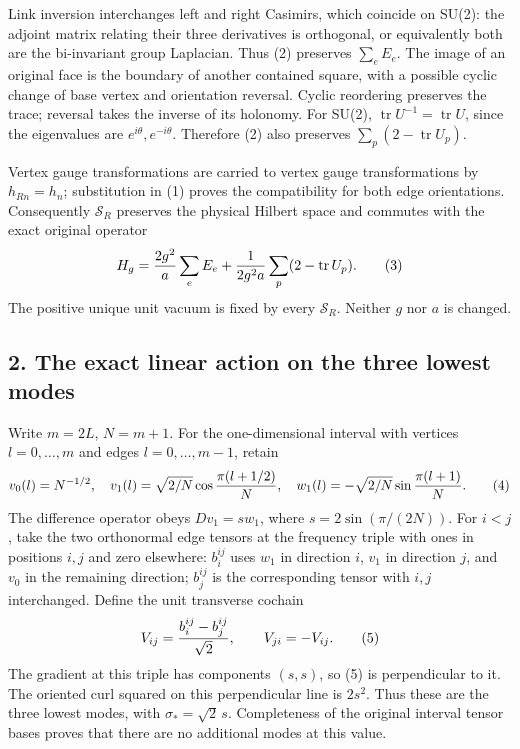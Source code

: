\documentclass[
  11pt,
]{article}
\begin{document}
Link inversion interchanges left and right Casimirs, which coincide on
SU(2): the adjoint matrix relating their three derivatives is
orthogonal, or equivalently both are the bi-invariant group Laplacian.
Thus (2) preserves \(\sum_e E_e\). The image of an original face is the
boundary of another contained square, with a possible cyclic change of
base vertex and orientation reversal. Cyclic reordering preserves the
trace; reversal takes the inverse of its holonomy. For SU(2),
\(\operatorname{tr}U^{-1}=\operatorname{tr}U\), since the eigenvalues
are \(e^{i\theta},e^{-i\theta}\). Therefore (2) also preserves
\(\sum_p(2-\operatorname{tr}U_p)\).

Vertex gauge transformations are carried to vertex gauge transformations
by \(h_{Rn}=h_n\); substitution in (1) proves the compatibility for both
edge orientations. Consequently \(\mathscr S_R\) preserves the physical
Hilbert space and commutes with the exact original operator \[
 H_g={2g^2\over a}\sum_e E_e+
                 {1\over2g^2a}\sum_p(2-\operatorname{tr}U_p).
 \tag{3}
\] The positive unique unit vacuum is fixed by every \(\mathscr S_R\).
Neither \(g\) nor \(a\) is changed.

\subsection{2. The exact linear action on the three lowest
modes}\label{weak-coupling-part-16-the-exact-linear-action-on-the-three-lowest-modes}

Write \(m=2L\), \(N=m+1\). For the one-dimensional interval with
vertices \(l=0,\ldots,m\) and edges \(l=0,\ldots,m-1\), retain \[
 v_0(l)=N^{-1/2},\quad
 v_1(l)=\sqrt{2/N}\cos{\pi(l+1/2)\over N},\quad
 w_1(l)=-\sqrt{2/N}\sin{\pi(l+1)\over N}.
 \tag{4}
\] The difference operator obeys \(Dv_1=s w_1\), where
\(s=2\sin(\pi/(2N))\). For \(i<j\), take the two orthonormal edge
tensors at the frequency triple with ones in positions \(i,j\) and zero
elsewhere: \(b_i^{ij}\) uses \(w_1\) in direction \(i\), \(v_1\) in
direction \(j\), and \(v_0\) in the remaining direction; \(b_j^{ij}\) is
the corresponding tensor with \(i,j\) interchanged. Define the unit
transverse cochain \[
 V_{ij}={b_i^{ij}-b_j^{ij}\over\sqrt2},\qquad
                  V_{ji}=-V_{ij}.
 \tag{5}
\] The gradient at this triple has components \((s,s)\), so (5) is
perpendicular to it. The oriented curl squared on this perpendicular
line is \(2s^2\). Thus these are the three lowest modes, with
\(\sigma_*=\sqrt2\,s\). Completeness of the original interval tensor
bases proves that there are no additional modes at this value.
\end{document}
